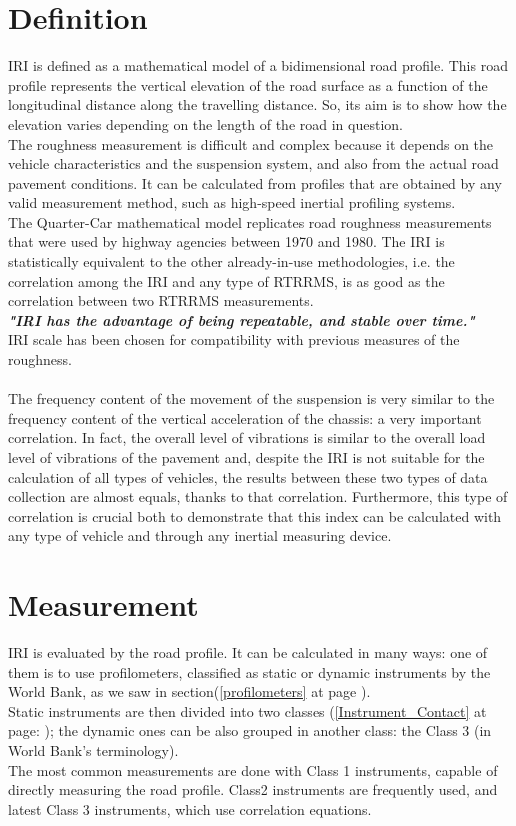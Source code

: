 \documentclass{standalone}
\begin{document}
\section{Definition}\label{IRI Definition}
IRI is defined as a mathematical model of a bidimensional road profile. This road profile represents the vertical elevation of the road surface as a function of the longitudinal distance along the travelling distance\cite{wang2006road}. So, its aim is to show how the elevation varies depending on the length of the road in question.
\\The roughness measurement is difficult and complex because it depends on the vehicle characteristics and the suspension system, and also from the actual road pavement conditions. It can be calculated from profiles that are obtained by any valid measurement method, such as high-speed inertial profiling systems.\\
The Quarter-Car mathematical model replicates road roughness measurements that were used by highway agencies between 1970 and 1980. The IRI is statistically equivalent to the other already-in-use methodologies, i.e. the correlation among the IRI and any type of RTRRMS, is as good as the correlation between two RTRRMS measurements.
\\
\textbf{\textit{"IRI has the advantage of being repeatable, and stable over time."}}\\
IRI scale has been chosen for compatibility with previous measures of the roughness.\\\\
The frequency content of the movement of the suspension is very similar to the frequency content of the vertical acceleration of the chassis: a very important correlation. In fact, the overall level of vibrations is similar to the overall load level of vibrations of the pavement and, despite the IRI is not suitable for the calculation of all types of vehicles, the results between these two types of data collection are almost equals, thanks to that correlation. Furthermore, this type of correlation is crucial both to demonstrate that this index can be calculated with any type of vehicle and through any inertial measuring device.

\section{Measurement}\label{Measurement of IRI}
IRI is evaluated by the road profile. It can be calculated in many ways: one of them is to use profilometers, classified as static or dynamic instruments by the World Bank, as we saw in section(\ref{profilometers} at page \pageref{profilometers}).\\Static instruments are then divided into two classes (\ref{Instrument_Contact} at page: \pageref{Instrument_Contact}); the dynamic ones can be also grouped in another class: the Class 3 (in World Bank's terminology).\\ The most common measurements are done with Class 1 instruments, capable of directly measuring the road profile. Class2 instruments are frequently used, and latest Class 3 instruments, which use correlation equations.
\end{document}
